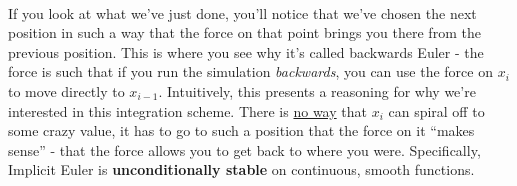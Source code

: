 \documentclass[]{article}
\begin{document}
\paragraph{}
If you look at what we've just done, you'll notice that we've chosen the next position in such a way that the force on that point brings you there from the previous position. This is where you see why it's called backwards Euler - the force is such that if you run the simulation \emph{backwards}, you can use the force on $x_i$ to move directly to $x_{i-1}$. Intuitively, this presents a reasoning for why we're interested in this integration scheme. There is \underline{no way} that $x_i$ can spiral off to some crazy value, it has to go to such a position that the force on it ``makes sense'' - that the force allows you to get back to where you were. Specifically, Implicit Euler is \textbf{unconditionally stable} on continuous, smooth functions.

\paragraph{}
\end{document}
